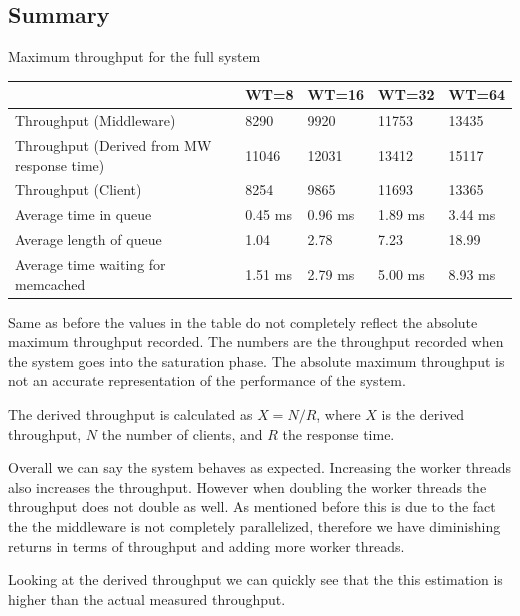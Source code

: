 \documentclass[11pt,a4paper]{article}
\begin{document}
\subsection{Summary}
%
\begin{center}
	{Maximum throughput for the full system}
	\begin{tabular}{|l|p{1.5cm}|p{1.5cm}|p{1.5cm}|p{1.5cm}|}
		\hline                                            & WT=8 & WT=16 & WT=32 & WT=64 \\ 
		\hline Throughput (Middleware)                    &  8290    &  9920    &   11753   &   13435   \\ 
		\hline Throughput (Derived from MW response time) &  11046   &  12031   &   13412   &   15117   \\ 
		\hline Throughput (Client)                        &  8254    &  9865    &   11693   &   13365   \\ 
		\hline Average time in queue                      &  0.45 ms &  0.96 ms &   1.89 ms &   3.44 ms \\ 
		\hline Average length of queue                    &  1.04    &  2.78    &   7.23    &   18.99   \\ 
		\hline Average time waiting for memcached         &  1.51 ms &  2.79 ms &   5.00 ms &   8.93 ms \\ 
		\hline 
	\end{tabular}
	\label{max_tp_table}
\end{center}
%
Same as before the values in the table do not completely reflect the absolute maximum throughput recorded.
%
The numbers are the throughput recorded when the system goes into the saturation phase.
%
The absolute maximum throughput is not an accurate representation of the performance of the system.
%
\par
%
The derived throughput is calculated as $X = N / R$, where $X$ is the derived throughput, $N$ the number of clients, and $R$ the response time.
%
\par
%
Overall we can say the system behaves as expected.
%
Increasing the worker threads also increases the throughput.
%
However when doubling the worker threads the throughput does not double as well.
%
As mentioned before this is due to the fact the the middleware is not completely parallelized, therefore we have diminishing returns in terms of throughput and adding more worker threads.
%
\par
%
Looking at the derived throughput we can quickly see that the this estimation is higher than the actual measured throughput.
\end{document}

